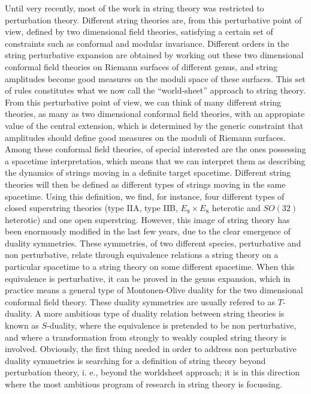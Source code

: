 Until very recently, most of the work in string theory was
restricted to perturbation theory. Different string theories are,
from this perturbative point of view, defined by two dimensional
field theories, satisfying a certain set of constraints such as
conformal and modular invariance. Different orders in the string
perturbative expansion are obtained by working out these two
dimensional conformal field theories on Riemann surfaces of
different genus, and string amplitudes become good measures on
the moduli space of these surfaces. This set of rules constitutes
what we now call the ``world-sheet'' approach to string theory.
From this perturbative point of view, we can think of many
different string theories, as many as two dimensional conformal
field theories, with an appropiate value of the central
extension, which is determined by the generic constraint that
amplitudes should define good measures on the moduli of Riemann
surfaces. Among these conformal field theories, of special
interested are the ones possessing a spacetime interpretation,
which means that we can interpret them as describing the dynamics
of strings moving in a definite target spacetime. Different
string theories will then be defined as different types of
strings moving in the same spacetime. Using this definition,
we find, for instance, four different types of closed superstring
theories (type IIA, type IIB, $E_8 \times E_8$ heterotic and
$SO(32)$ heterotic) and one open superstring. However, this image
of string theory has been enormously modified in the last few
years, due to the clear emergence of duality symmetries. These
symmetries, of two different species, perturbative and non
perturbative, relate through equivalence relations a string
theory on a particular spacetime to a string theory on some
different spacetime. When this equivalence is perturbative, it
can be proved in the genus expansion, which in practice means a
general type of Montonen-Olive duality for the two dimensional
conformal field theory. These duality symmetries are usually
refered to as $T$-duality. A more ambitious type of duality
relation between string theories is known as $S$-duality, where
the equivalence is pretended to be non perturbative, and where a
transformation from strongly to weakly coupled string theory is
involved. Obviously, the first thing needed in order to address
non perturbative duality symmetries is searching for a definition
of string theory beyond perturbation theory, i. e., beyond the
worldsheet approach; it is in this direction where the most
ambitious program of research in string theory is focussing.
  
